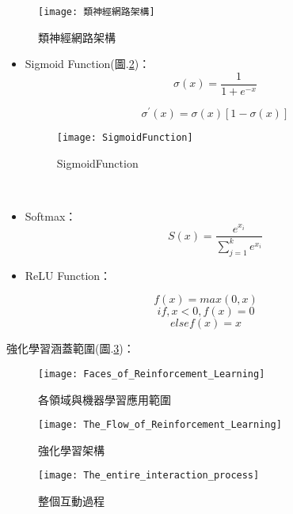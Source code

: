 \begin{figure}
\begin{center}
\texttt{[image: 類神經網路架構]}
\caption{\Large 類神經網路架構}
\label{類神經網路架構}
\end{center}
\end{figure}
\begin{itemize}
\item Sigmoid Function(圖.\ref{SigmoidFunction})：\\
$$\sigma(x)=\frac{1}{1+e^{-x}}$$

$$\sigma^{'}(x)=\sigma(x)[1-\sigma(x)]$$
\begin{figure}[hbt!]
\begin{center}
\texttt{[image: SigmoidFunction]}
\caption{\Large SigmoidFunction}\label{SigmoidFunction}
\end{center}
\end{figure}
\\
\item Softmax：\\
$$S(x)=\frac{e^{x_i}}{\sum^k_{j=1}e^{x_i}}$$
\item ReLU Function：\\
\end{itemize}
$$f(x)=max(0,x)$$
$$if , x<0 , f(x)=0$$
$$else f(x)=x$$


強化學習涵蓋範圍(圖.\ref{各領域與機器學習應用範圍})：\\
 
\begin{figure}[hbt!]
\begin{center}
\texttt{[image: Faces\_of\_Reinforcement\_Learning]}
\caption{\Large 各領域與機器學習應用範圍}
\label{各領域與機器學習應用範圍}
\end{center}
\end{figure}
\newpage
\begin{figure}[hbt!]
\begin{center}
\texttt{[image: The\_Flow\_of\_Reinforcement\_Learning]}
\caption{\Large 強化學習架構}
\label{RL structur}
\end{center}
\end{figure}
\newpage
\begin{figure}[hbt!]
\begin{center}
\texttt{[image: The\_entire\_interaction\_process]}
\caption{\Large 整個互動過程}
\label{整個互動過程}
\end{center}
\end{figure}

